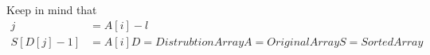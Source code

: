 \documentclass[preview]{standalone}
\begin{document}
\begin{center}
Keep in mind that\begin{align*}j & = A[i] - l \\S[D[j] - 1] & = A[i]D = Distrubtion ArrayA = Original ArrayS = Sorted Array\end{align*}
\end{center}
\end{document}
